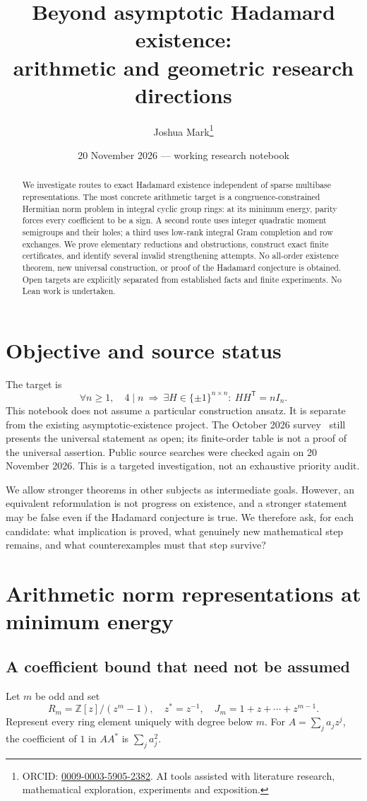 \documentclass[11pt]{article}
\title{Beyond asymptotic Hadamard existence:\\arithmetic and geometric research directions}
\author{Joshua Mark\thanks{ORCID: \href{https://orcid.org/0009-0003-5905-2382}{0009-0003-5905-2382}. AI tools assisted with literature research, mathematical exploration, experiments and exposition.}}
\date{20 November 2026 --- working research notebook}
\newcommand{\Z}{\mathbb Z}
\begin{document}
\maketitle
\begin{abstract}
We investigate routes to exact Hadamard existence independent of sparse
multibase representations. The most concrete arithmetic target is a
congruence-constrained Hermitian norm problem in integral cyclic group
rings: at its minimum energy, parity forces every coefficient to be a
sign. A second route uses integer quadratic moment semigroups and their
holes; a third uses low-rank integral Gram completion and row exchanges.
We prove elementary reductions and obstructions, construct exact finite
certificates, and identify several invalid strengthening attempts.
No all-order existence theorem, new universal construction, or proof of
the Hadamard conjecture is obtained. Open targets are explicitly separated
from established facts and finite experiments. No Lean work is undertaken.
\end{abstract}

\section{Objective and source status}
The target is
\[
\forall n\ge1,\quad 4\mid n\ \Longrightarrow\
\exists H\in\{\pm1\}^{n\times n}:\ HH^{\mathsf T}=nI_n.
\]
This notebook does not assume a particular construction ansatz. It is
separate from the existing asymptotic-existence project. The October
2026 survey~\cite{Survey} still presents the universal statement as open;
its finite-order table is not a proof of the universal assertion. Public
source searches were checked again on 20 November 2026. This is a
targeted investigation, not an exhaustive priority audit.

We allow stronger theorems in other subjects as intermediate goals.
However, an equivalent reformulation is not progress on existence, and
a stronger statement may be false even if the Hadamard conjecture is
true. We therefore ask, for each candidate: what implication is proved,
what genuinely new mathematical step remains, and what counterexamples
must that step survive?

\section{Arithmetic norm representations at minimum energy}
\subsection{A coefficient bound that need not be assumed}
Let $m$ be odd and set
\[
 R_m=\Z[z]/(z^m-1),\quad z^*=z^{-1},\quad
 J_m=1+z+\cdots+z^{m-1}.
\]
Represent every ring element uniquely with degree below $m$. For
$A=\sum_j a_jz^j$, the coefficient of $1$ in $AA^*$ is $\sum_j a_j^2$.
\end{document}
